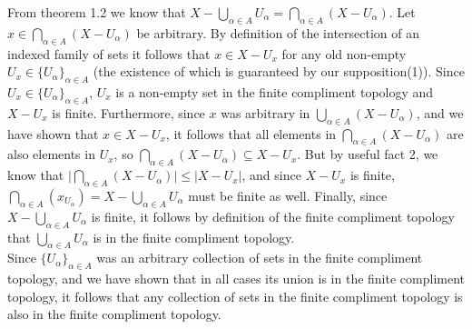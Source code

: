 \documentclass{article}
\theoremstyle{definition}
\begin{document}
\begin{enumerate}
    From theorem 1.2 we know that $X - \bigcup_{\alpha\in A}U_\alpha = 
    \bigcap_{\alpha\in A}(X-U_\alpha)$. Let $x\in \bigcap_{\alpha\in A}(X-U_\alpha)$ be arbitrary. By definition of the intersection of an indexed family of sets it follows that $x\in X-U_x$ for any old non-empty $U_x\in \{U_\alpha\}_{\alpha\in A}$ (the existence of which is guaranteed by our supposition(1)). Since $U_x\in \{U_\alpha\}_{\alpha\in A}$, $U_x$ is a non-empty set in the finite compliment topology and $X-U_x$ is finite. Furthermore, since $x$ was arbitrary in $\bigcup_{\alpha\in A}(X- U_\alpha)$, and we have shown that $x\in X-U_x$, it follows that all elements in $\bigcap_{\alpha\in A}(X-U_\alpha)$ are also elements in $U_x$, so $\bigcap_{\alpha\in A}(X-U_\alpha)\subseteq X-U_x$. But by useful fact 2,  we know that $\big | \bigcap_{\alpha\in A}(X-U_\alpha)\big | \le  |X-U_x| $, and since $X-U_x$ is finite, $\bigcap_{\alpha\in A}(x_U_\alpha) = X - \bigcup_{\alpha\in A}U_\alpha$ must be finite as well. Finally, since  $X - \bigcup_{\alpha\in A}U_\alpha$ is finite, it follows by definition of the finite compliment topology that $\bigcup_{\alpha\in A}U_\alpha$ is in the finite compliment topology. \\
    
    Since $\{U_\alpha\}_{\alpha\in A}$ was an arbitrary collection of sets in the finite compliment topology, and we have shown that in all cases its union is in the finite compliment topology, it follows that any collection of sets in the finite compliment topology is also in the finite compliment topology. 
\end{enumerate}


\newpage
\end{document}
